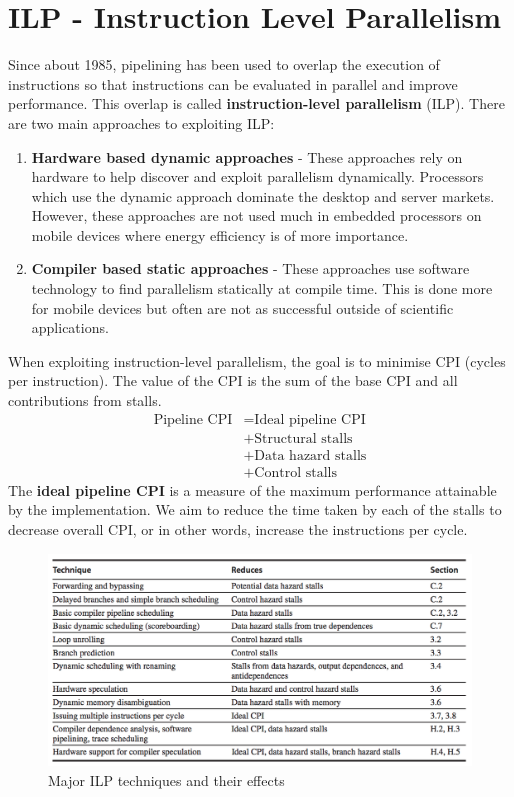 \documentclass[11pt]{article}
\begin{document}
\section{ILP - Instruction Level Parallelism}
Since about 1985, pipelining has been used to overlap the execution of instructions so that instructions can be evaluated in parallel and improve performance. This overlap is called \textbf{instruction-level parallelism} (ILP).
\n
There are two main approaches to exploiting ILP:
\begin{enumerate}
\item \textbf{Hardware based dynamic approaches} - These approaches rely on hardware to help discover and exploit parallelism dynamically. Processors which use the dynamic approach dominate the desktop and server markets. However, these approaches are not used much in embedded processors on mobile devices where energy efficiency is of more importance. 
\item \textbf{Compiler based static approaches} - These approaches use software technology to find parallelism statically at compile time. This is done more for mobile devices but often are not as successful outside of scientific applications.
\end{enumerate}
\noindent
When exploiting instruction-level parallelism, the goal is to minimise CPI (cycles per instruction). The value of the CPI is the sum of the base CPI and all contributions from stalls.
\begin{align*}
  \text{Pipeline CPI} & = \text{Ideal pipeline CPI} \\
                      & + \text{Structural stalls} \\
                      & + \text{Data hazard stalls} \\
                      & + \text{Control stalls}
\end{align*}
\noindent
The \textbf{ideal pipeline CPI} is a measure of the maximum performance attainable by the implementation. We aim to reduce the time taken by each of the stalls to decrease overall CPI, or in other words, increase the instructions per cycle.
\begin{figure}[H]
  \centering
  \includegraphics[width=1\textwidth, keepaspectratio]{imgs/ilp-techniques.png}
  \caption{Major ILP techniques and their effects}
\end{figure}
\end{document}
